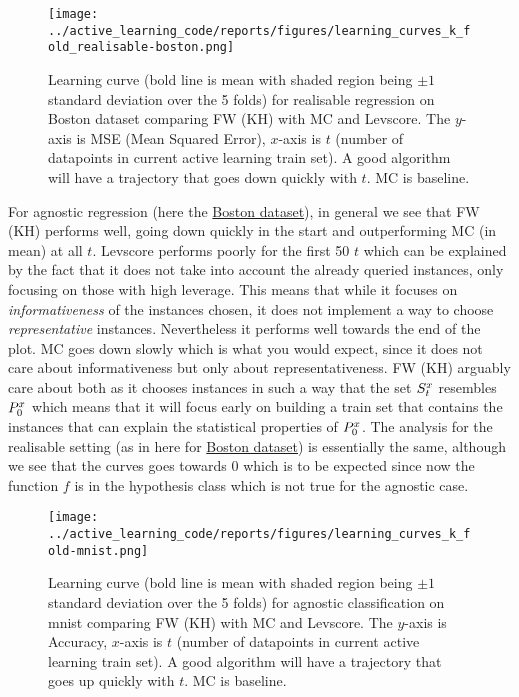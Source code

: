 \begin{figure}[h] \centering
  \label{fig:learning-curve-boston-realisable-experiments}
  \texttt{[image: ../active\_learning\_code/reports/figures/learning\_curves\_k\_fold\_realisable-boston.png]}
  \caption{Learning curve (bold line is mean with shaded region being \(\pm 1\)
    standard deviation over the 5 folds) for realisable regression on Boston dataset
    comparing FW (KH) with MC and Levscore. The \(y\)-axis is MSE (Mean Squared
    Error), \(x\)-axis is \(t\) (number of datapoints in current active learning
    train set). A good algorithm will have a trajectory that goes down quickly with
    \(t\). MC is baseline.}
  \label{fig:mesh1}
\end{figure}


For agnostic regression (here the
\hyperref[fig:learning-curve-boston-agnostic-experiments]{Boston dataset}), in
general we see that FW (KH) performs well, going down quickly in the start and
outperforming MC (in mean) at all \(t\). Levscore performs poorly for the first
50 \(t\) which can be explained by the fact that it does not take into account
the already queried instances, only focusing on those with high leverage. This
means that while it focuses on \textit{informativeness} of the instances chosen,
it does not implement a way to choose \textit{representative} instances.
Nevertheless it performs well towards the end of the plot. MC goes down slowly
which is what you would expect, since it does not care about informativeness but
only about representativeness. FW (KH) arguably care about both as it chooses
instances in such a way that the set \(S^x_t\) resembles \(P^x_0\)
which means that it will focus early on building a train set that contains the
instances that can explain the statistical properties of \(P^x_0\). The
analysis for the realisable setting (as in here for
\hyperref[fig:learning-curve-boston-realisable-experiments]{Boston dataset}) is
essentially the same, although we see that the curves goes towards 0 which is to
be expected since now the function \(f\) is in the hypothesis class which is not
true for the agnostic case.

\begin{figure}[h] \centering
  \label{fig:learning-curve-mnist-agnostic-experiments}
  \texttt{[image: ../active\_learning\_code/reports/figures/learning\_curves\_k\_fold-mnist.png]}
  \caption{Learning curve (bold line is mean with shaded region being \(\pm 1\)
    standard deviation over the 5 folds) for agnostic classification on mnist
    comparing FW (KH) with MC and Levscore. The \(y\)-axis is Accuracy, \(x\)-axis
    is \(t\) (number of datapoints in current active learning train set). A good
    algorithm will have a trajectory that goes up quickly with \(t\). MC is
    baseline.}
\end{figure}

